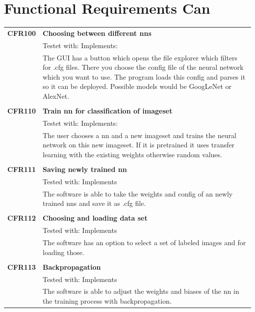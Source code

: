 \documentclass[parskip=full]{scrartcl}
\begin{document}
\section{Functional Requirements Can}
\begin{tabular}{p{2cm}p{12cm}}
\textbf{CFR100} & \textbf{Choosing between different \glspl{nn}}\\
& Testet with: Implements: \\
& The GUI has a button which opens the file explorer which filters for .cfg files. There you choose the config file of the neural network which you want to use. The program loads this config and parses it so it can be deployed. Possible models would be GoogLeNet or AlexNet.\\
& \\
\textbf{CFR110} & \textbf{Train \gls{nn} for classification of imageset}\\
& Testet with: Implements: \\
& The user chooses a \gls{nn} and a new imageset and trains the neural network on this new imageset. If it is pretrained it uses transfer learning with the existing weights otherwise random values.\\
& \\
\textbf {CFR111} & \textbf{Saving newly trained \gls{nn}} \\
& Tested with: Implements\\
& The software is able to take the weights and config of an newly trained \glspl{nn} and save it as .cfg file. \\
& \\
\textbf {CFR112} & \textbf{Choosing and loading data set} \\
& Tested with: Implements\\
& The software has an option to select a set of labeled images and for loading those.\\
& \\
\textbf {CFR113} & \textbf{Backpropagation} \\
& Tested with: Implements\\
& The software is able to adjust the weights and biases of the \gls{nn} in the training process with backpropagation.\\
\end{tabular}
\newpage
\end{document}
